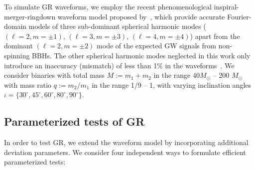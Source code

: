 \documentclass[prd,preprintnumbers,twocolumn,eqsecnum,floatfix,a4paper,nofootinbib,superscriptaddress]{revtex4}
\begin{document}
To simulate GR waveforms, we employ the recent phenomenological inspiral-merger-ringdown waveform model proposed by~\cite{Mehta:2017jpq}, which provide accurate Fourier-domain models of three sub-dominant spherical harmonic modes ($(\ell = 2, m=\pm1)$, $(\ell = 3, m=\pm3)$, $(\ell = 4, m = \pm4)$) apart from the dominant $(\ell = 2, m = \pm2)$ mode of the expected GW signals from non-spinning BBHs. The other spherical harmonic modes neglected in this work only introduce an inaccuracy (mismatch) of less than 1\% in the waveforms~\cite{Mehta:2017jpq}. We consider binaries with total mass $M := m_1 + m_2$ in the range $40 M_\odot$ -- 200 $M_\odot$ with mass ratio $q := m_2/m_1$ in the range 1/9 -- 1, with varying inclination angles $\iota=\{30^{\circ},45^{\circ},60^{\circ},80^{\circ},90^{\circ}\}$.

\subsection{Parameterized tests of GR}
\label{2b}
In order to test GR, we extend the waveform model by incorporating additional deviation parameters.  We consider four independent ways to formulate efficient parameterized tests:
\end{document}
